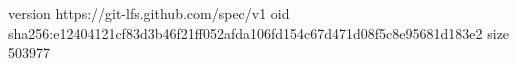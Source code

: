 version https://git-lfs.github.com/spec/v1
oid sha256:e12404121cf83d3b46f21ff052afda106fd154c67d471d08f5c8e95681d183e2
size 503977
